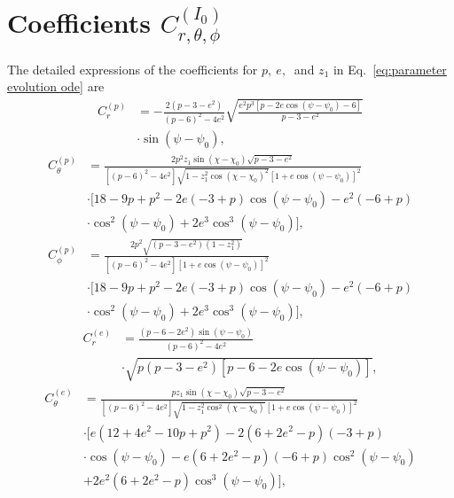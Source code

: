 \documentclass[aps,prx,reprint,superscriptaddress,nofootinbib,longbibliography]{revtex4-1}
\begin{document}
\section{Coefficients $C_{r,\theta,\phi}^{(I_0)}$}\label{appendix:coefficients}
The detailed expressions of the coefficients for $p,\ e,\ $ and $z_{1}$ in Eq.~\eqref{eq:parameter evolution ode} are
\begin{equation}
\begin{aligned}
     C^{(p)}_{r}&=-\frac{2(p-3-e^2)}{(p-6)^2-4e^2}\sqrt{\frac{e^2p^3[p-2e\cos(\psi-\psi_{0})-6]}{p-3-e^2}}\\
     &\cdot\sin(\psi-\psi_{0}),
\end{aligned}
\end{equation}
\begin{equation}
    \begin{aligned}
    C^{(p)}_{\theta}&=\frac{2p^2 z_{1}\sin(\chi-\chi_{0})\sqrt{p-3-e^2}}{[(p-6)^2-4e^2]\sqrt{1-z_{1}^{2}\cos(\chi-\chi_{0})^{2}}[1+e\cos(\psi-\psi_{0})]^2}\\
    &\cdot[18-9p+p^2-2e(-3+p)\cos(\psi-\psi_{0})-e^2(-6+p)\\
    &\cdot\cos^{2}(\psi-\psi_{0})+2e^{3}\cos^{3}(\psi-\psi_{0})],
\end{aligned}
\end{equation}
\begin{equation}
    \begin{aligned}
        C^{(p)}_{\phi}&=\frac{2p^2\sqrt{(p-3-e^2)(1-z_{1}^{2})}}{[(p-6)^{2}-4e^{2}][1+e\cos(\psi-\psi_{0})]^{2}}\\
        &\cdot[18-9p+p^{2}-2e(-3+p)\cos(\psi-\psi_{0})-e^{2}(-6+p)\\
        &\cdot\cos^{2}(\psi-\psi_{0})+2e^{3}\cos^{3}(\psi-\psi_{0})],
    \end{aligned}
\end{equation}
\begin{equation}
\begin{aligned}
     C^{(e)}_{r}&=\frac{(p-6-2e^2)\sin(\psi-\psi_{0})}{(p-6)^{2}-4e^2}\\
     &\cdot\sqrt{p(p-3-e^{2})[p-6-2e\cos(\psi-\psi_{0})]},
\end{aligned}
\end{equation}
\begin{equation}
    \begin{aligned}
        C^{(e)}_{\theta}&=\frac{pz_{1}\sin(\chi-\chi_{0})\sqrt{p-3-e^{2}}}{[(p-6)^{2}-4e^{2}]\sqrt{1-z_{1}^{2}\cos^{2}(\chi-\chi_{0})}[1+e\cos(\psi-\psi_{0})]^{2}}\\
        &\cdot[e(12+4e^{2}-10p+p^{2})-2(6+2e^{2}-p)(-3+p)\\
        &\cdot\cos(\psi-\psi_{0})-e(6+2e^{2}-p)(-6+p)\cos^{2}(\psi-\psi_{0})\\
        &+2e^{2}(6+2e^{2}-p)\cos^{3}(\psi-\psi_{0})],
    \end{aligned}
\end{equation}
\end{document}

